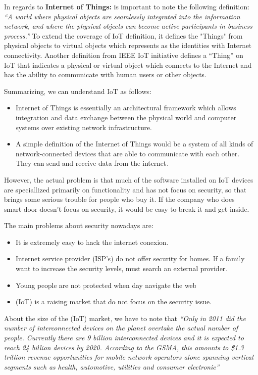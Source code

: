 In regards to \textbf{Internet of Things:} is important to note the following definition: \textit{``A world where physical objects are seamlessly integrated into the information network, and where the physical objects can become active participants in business process.''}\cite{IoT1}
To  extend  the coverage of IoT definition, \cite{IoT2}it  defines  the  "Things"  from  physical  objects  to  virtual  objects  which represents as the identities with Internet connectivity. Another definition from IEEE IoT initiative \cite{IoT3}defines a ``Thing'' on IoT that indicates a physical or virtual object which connects to the Internet and has the ability to communicate with human users or other objects. 

Summarizing, we can understand IoT as follows:\cite{Paper1}
\begin{itemize}
	\item Internet of Things is essentially an architectural framework which allows integration and data exchange between the physical world and computer systems over existing network infrastructure.
	\item A simple definition of the Internet of Things would be a system of all kinds of network-connected devices that are able to communicate with each other. They can send and receive data from the internet.
\end{itemize}

However, the actual problem is that much of the software installed on IoT devices are speciallized primarily on functionality and has not focus on security, so that brings some serious trouble for people who buy it. If the company who does smart door doesn't focus on security, it  would be easy to break it and get inside.

The main problems about security nowadays are:
\begin{itemize}
	\item It is extremely easy to hack the internet conexion.
	\item Internet service provider (ISP’s) do not offer security for homes. If a family want to increase the security levels, must search an external provider.  
	\item Young people are not protected when day navigate the web
	\item (IoT) is a raising market that do not focus on the security issue. 

\end{itemize}

About the size of the (IoT) market, we have to note that \textit{``Only in 2011 did the number of interconnected devices on the planet overtake the actual number of people. Currently there are 9 billion interconnected devices and it is expected to reach 24 billion devices by 2020. According to the GSMA, this amounts to \$1.3 trillion revenue opportunities for mobile network operators alone spanning vertical segments such as health, automotive, utilities and consumer electronic''}\cite{Data1}

